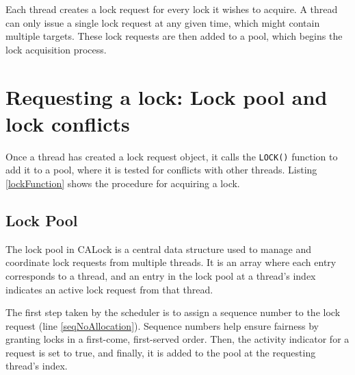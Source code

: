 Each thread creates a lock request for every lock it wishes to acquire. A thread can only issue a single lock request at any given time, which might contain multiple targets. These lock requests are then added to a pool, which begins the lock acquisition process. 



\section{Requesting a lock: Lock pool and lock conflicts}
Once a thread has created a lock request object, it calls the \lstinline|LOCK()| function to add it to a pool, where it is tested for conflicts with other threads. Listing \ref{lockFunction} shows the procedure for acquiring a lock.

\subsection{Lock Pool}
The lock pool in CALock is a central data structure used to manage and coordinate lock requests from multiple threads. It is an array where each entry corresponds to a thread, and an entry in the lock pool at a thread's index indicates an active lock request from that thread.

The first step taken by the scheduler is to assign a sequence number to the lock request (line \ref{seqNoAllocation}). Sequence numbers help ensure fairness by granting locks in a first-come, first-served order. Then, the activity indicator for a request is set to true, and finally, it is added to the pool at the requesting thread's index. 



